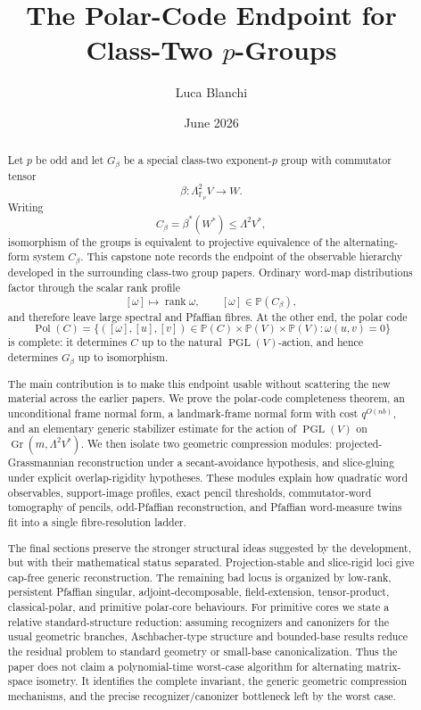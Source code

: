 \documentclass[11pt]{article}
\title{The Polar-Code Endpoint for Class-Two $p$-Groups}
\author{Luca Blanchi}
\date{June 2026}
\begin{document}
\maketitle

\begin{abstract}
Let $p$ be odd and let $G_\beta$ be a special class-two exponent-$p$ group with commutator tensor
\[
\beta:\Lambda^2_{\mathbb F_p}V\to W.
\]
Writing
\[
C_\beta=\beta^*(W^*)\le \Lambda^2V^*,
\]
isomorphism of the groups is equivalent to projective equivalence of the alternating-form system $C_\beta$. This capstone note records the endpoint of the observable hierarchy developed in the surrounding class-two group papers. Ordinary word-map distributions factor through the scalar rank profile
\[
[\omega]\mapsto \operatorname{rank}\omega,
\qquad [\omega]\in\mathbb P(C_\beta),
\]
and therefore leave large spectral and Pfaffian fibres. At the other end, the polar code
\[
\operatorname{Pol}(C)
=
\{([\omega],[u],[v])\in\mathbb P(C)\times\mathbb P(V)\times\mathbb P(V):
\omega(u,v)=0\}
\]
is complete: it determines $C$ up to the natural $\operatorname{PGL}(V)$-action, and hence determines $G_\beta$ up to isomorphism.

The main contribution is to make this endpoint usable without scattering the new material across the earlier papers. We prove the polar-code completeness theorem, an unconditional frame normal form, a landmark-frame normal form with cost $q^{O(nb)}$, and an elementary generic stabilizer estimate for the action of $\operatorname{PGL}(V)$ on $\operatorname{Gr}(m,\Lambda^2V^*)$. We then isolate two geometric compression modules: projected-Grassmannian reconstruction under a secant-avoidance hypothesis, and slice-gluing under explicit overlap-rigidity hypotheses. These modules explain how quadratic word observables, support-image profiles, exact pencil thresholds, commutator-word tomography of pencils, odd-Pfaffian reconstruction, and Pfaffian word-measure twins fit into a single fibre-resolution ladder.

The final sections preserve the stronger structural ideas suggested by the development, but with their mathematical status separated. Projection-stable and slice-rigid loci give cap-free generic reconstruction. The remaining bad locus is organized by low-rank, persistent Pfaffian singular, adjoint-decomposable, field-extension, tensor-product, classical-polar, and primitive polar-core behaviours. For primitive cores we state a relative standard-structure reduction: assuming recognizers and canonizers for the usual geometric branches, Aschbacher-type structure and bounded-base results reduce the residual problem to standard geometry or small-base canonicalization. Thus the paper does not claim a polynomial-time worst-case algorithm for alternating matrix-space isometry. It identifies the complete invariant, the generic geometric compression mechanisms, and the precise recognizer/canonizer bottleneck left by the worst case.
\end{abstract}
\end{document}
